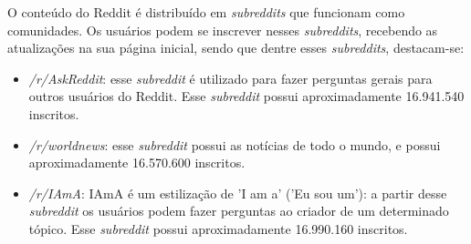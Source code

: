 O conteúdo do Reddit é distribuído em \textit{subreddits} que funcionam como
comunidades. Os usuários podem se inscrever nesses
\textit{subreddits}, recebendo as atualizações na sua página inicial, sendo
que dentre esses \textit{subreddits}, destacam-se:


\begin{itemize}
  \item \textit{/r/AskReddit}: esse \textit{subreddit} é utilizado para fazer
  perguntas gerais para outros usuários do Reddit. Esse \textit{subreddit}
  possui aproximadamente 16.941.540 inscritos.
  \item \textit{/r/worldnews}: esse \textit{subreddit} possui as notícias de
  todo o mundo, e possui aproximadamente 16.570.600 inscritos.
  \item \textit{/r/IAmA}: IAmA é um estilização de 'I am a' ('Eu sou um'):
  a partir desse \textit{subreddit} os usuários podem fazer perguntas ao criador
  de um determinado tópico. Esse \textit{subreddit} possui aproximadamente
  16.990.160 inscritos.
\end{itemize}

% 


